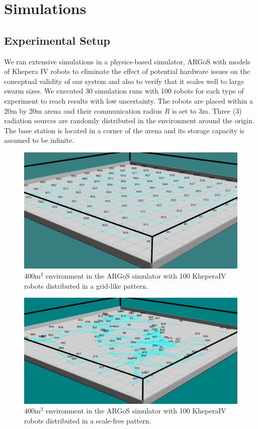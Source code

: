\documentclass[letterpaper, 10 pt, conference]{ieeeconf}
\begin{document}
\section{Simulations}
\label{Simulations}

\subsection{Experimental Setup}
We ran extensive simulations in a physics-based simulator, ARGoS
\cite{Pinciroli:SI2012} with models of Khepera IV
\cite{kteam2021kheperaiv} robots to eliminate the effect of potential
hardware issues on the conceptual validity of our system and also to
verify that it scales well to large swarm sizes. We executed 30 simulation
runs with 100 robots for each type of experiment to reach results
with low uncertainty. The robots are placed within a 20m by 20m arena and their communication radius $R$ is set to 3m. Three (3) radiation sources are randomly distributed in the environment around the origin. The base station is located in a corner of the arena and its storage capacity is assumed to be infinite. 

\begin{figure}[h]
	\centering
    \includegraphics[width=0.90\columnwidth]{figures/argos_grid_link.png}
    \caption{$400 \text{m}^2$ environment in the ARGoS simulator with 100 KheperaIV robots distributed in a grid-like pattern.}
    \label{argos}
\end{figure}

\begin{figure}[h]
	\centering
    \includegraphics[width=0.90\columnwidth]{figures/argos_scale_free.png}
    \caption{$400 \text{m}^2$ environment in the ARGoS simulator with 100 KheperaIV robots distributed in a scale-free pattern.}
    \label{argos}
\end{figure}
\end{document}
